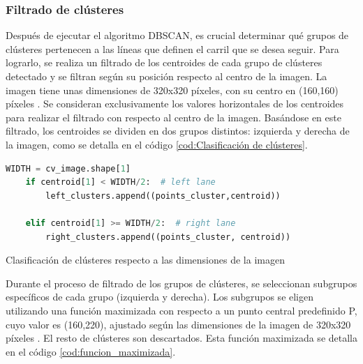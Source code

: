 \subsubsection{Filtrado de clústeres}
\label{clasificación:cluster}
Después de ejecutar el algoritmo DBSCAN, es crucial determinar qué grupos de clústeres pertenecen a las líneas que definen el carril que se desea seguir. 
Para lograrlo, se realiza un filtrado de los centroides de cada
grupo de clústeres detectado y se filtran según su posición respecto al centro de la imagen. La imagen tiene unas dimensiones de 320x320 píxeles, con su centro en (160,160) píxeles 
. Se consideran exclusivamente los valores horizontales de los centroides para realizar el filtrado con respecto al centro de la imagen. Basándose en este filtrado, 
los centroides se dividen en dos grupos distintos: izquierda y derecha de la imagen, como se detalla en el código \ref{cod:Clasificación de clústeres}. 

\begin{code}[h]
  \begin{lstlisting}[language=Python]
    WIDTH = cv_image.shape[1]
    if centroid[1] < WIDTH/2:  # left lane
        left_clusters.append((points_cluster,centroid))
       
    elif centroid[1] >= WIDTH/2:  # right lane
        right_clusters.append((points_cluster, centroid))
  \end{lstlisting}
  \caption[Clasificación de clústeres según las dimensiones de la imagen ]{Clasificación de clústeres respecto a las dimensiones de la imagen}
  \label{cod:Clasificación de clústeres}
  \end{code}  

Durante el proceso de filtrado de los grupos de clústeres, se seleccionan subgrupos específicos de cada grupo (izquierda y derecha). Los subgrupos se eligen utilizando una función 
maximizada con respecto a un punto central predefinido P, cuyo valor es (160,220), ajustado según las dimensiones de la imagen de 320x320 píxeles . El resto de clústeres son 
descartados. Esta función maximizada se detalla en el código \ref{cod:funcion_maximizada}. 


